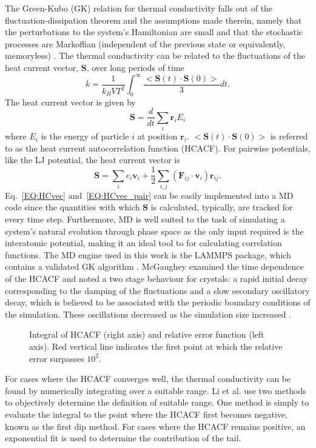 The Green-Kubo (GK) relation for thermal conductivity falls out of the fluctuation-dissipation theorem and the assumptions made therein, namely that the perturbations to the system's Hamiltonian are small and that the stochastic processes are Markoffian (independent of the previous state or equivalently, memoryless) \cite{green:398}. The thermal conductivity can be related to the fluctuations of the heat current vector, $\bm{S}$, over long periods of time
%
\begin{equation}\label{EQ:intHCACF}
k=\frac{1}{k_B V T^2}\int_0^{\infty}\frac{<\bm{S}(t)\cdot\bm{S}(0)>}{3}dt.
\end{equation}
%
The heat current vector is given by 
%
\begin{equation}\label{EQ:HCvec}
\bm{S}=\frac{d}{dt}\sum_i\bm{r}_iE_i
\end{equation}
%
where $E_i$ is the energy of particle $i$ at position $\bm{r}_i$. $<\bm{S}(t)\cdot\bm{S}(0)>$ is referred to as the heat current autocorrelation function (HCACF). For pairwise potentials, like the LJ potential, the heat current vector is
%
\begin{equation}\label{EQ:HCvec_pair}
\bm{S}=\sum_ie_i\bm{v}_i+\frac{1}{2}\sum_{i,j}(\bm{F}_{ij}\cdot\bm{v}_{i})\bm{r}_{ij}.
\end{equation}
%
Eq.~\ref{EQ:HCvec} and~\ref{EQ:HCvec_pair} can be easily implemented into a MD code since the quantities with which $\bm{S}$ is calculated, typically, are tracked for every time step. Furthermore, MD is well suited to the task of simulating a system's natural evolution through phase space as the only input required is the interatomic potential, making it an ideal tool to for calculating correlation functions. The MD engine used in this work is  the LAMMPS package, which contains a validated GK algorithm \cite{LAMMPS}. McGaughey examined the time dependence of the HCACF and noted a two stage behaviour for crystals: a rapid initial decay corresponding to the damping of the fluctuations and a slow secondary oscillatory decay, which is believed to be associated with the periodic boundary conditions of the simulation. These oscillations decreased as the simulation size increased \cite{mcgaugheythesis}.
%
\begin{figure}[t]
\begin{center}
\renewcommand{\figure}{Fig.}
\caption{Integral of HCACF (right axis) and relative error function (left axis). Red vertical line indicates the first point at which the relative error surpasses $10^2$.}
\label{FIG:GK_bulk}
\end{center}
\end{figure}
%
For cases where the HCACF converges well, the thermal conductivity can be found by numerically integrating over a suitable range. Li et al. \cite{Li1998139} use two methods to objectively determine the definition of suitable range. One method is simply to evaluate the integral to the point where the HCACF first becomes negative, known as the first dip method. For cases where the HCACF remains positive, an exponential fit is used to determine the contribution of the tail.

